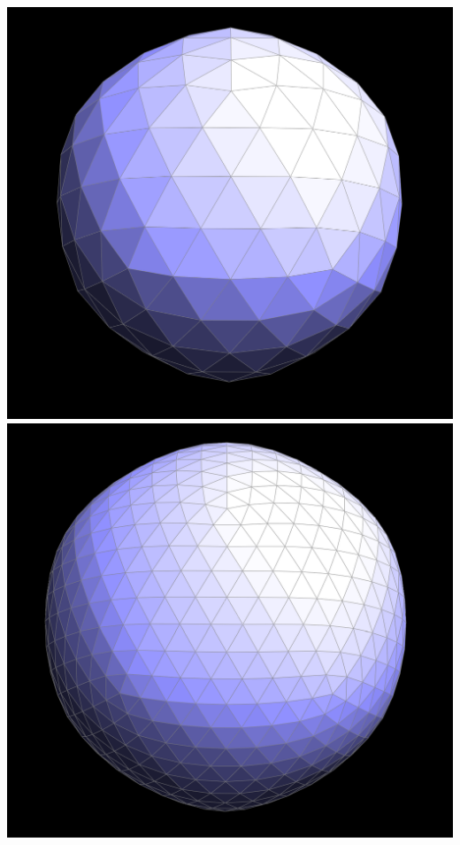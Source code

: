 \documentclass{article}
\begin{document}
\begin{center}
    \includegraphics[]{task 6/iso3.png}
    \includegraphics[]{task 6/iso4.png}

\end{center}
\end{document}

